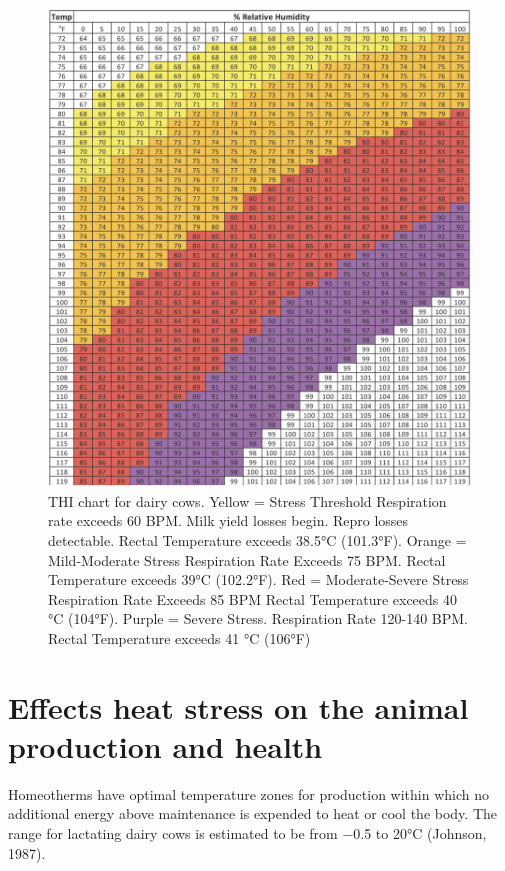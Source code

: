 \documentclass[]{book}
\begin{document}
\begin{figure}

{\centering \includegraphics[width=1\linewidth]{figures/THI} 

}

\caption{THI chart for dairy cows. Yellow = Stress Threshold Respiration rate exceeds 60 BPM. Milk yield losses begin. Repro losses detectable. Rectal Temperature exceeds 38.5°C (101.3°F). Orange = Mild-Moderate Stress Respiration Rate Exceeds 75 BPM. Rectal Temperature exceeds 39°C (102.2°F). Red = Moderate-Severe Stress Respiration Rate Exceeds 85 BPM Rectal Temperature exceeds 40 °C (104°F). Purple = Severe Stress. Respiration Rate 120-140 BPM. Rectal Temperature exceeds 41 °C (106°F)}\label{fig:THI}
\end{figure}

\section{Effects heat stress on the animal production and
health}\label{effects-heat-stress-on-the-animal-production-and-health}

Homeotherms have optimal temperature zones for production within which
no additional energy above maintenance is expended to heat or cool the
body. The range for lactating dairy cows is estimated to be from −0.5 to
20°C (Johnson, 1987).
\end{document}

